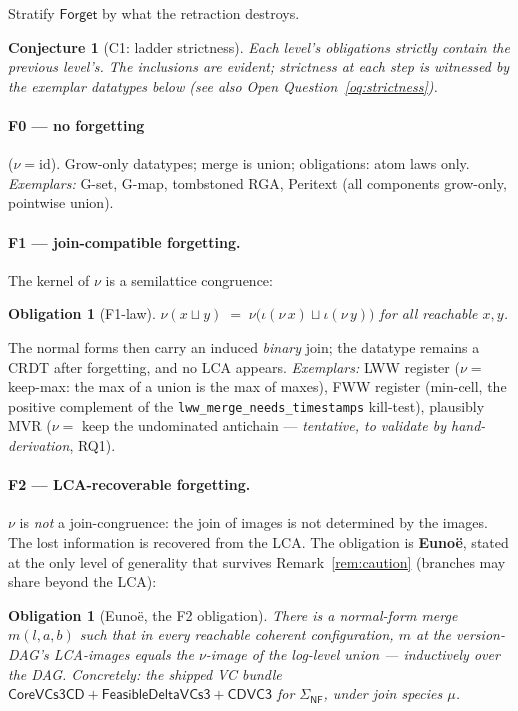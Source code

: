 \documentclass[11pt]{article}
\newtheorem{conjecture}[theorem]{Conjecture}
\newtheorem{obligation}[theorem]{Obligation}
\newcommand{\co}{\mathsf{CoreVCs3CD}}
\newcommand{\fd}{\mathsf{FeasibleDeltaVCs3}}
\newcommand{\cd}{\mathsf{CDVC3}}
\newcommand{\lean}[1]{\texttt{#1}}
\newcommand{\Forget}{\mathsf{Forget}}
\newcommand{\NF}{\mathsf{NF}}
\begin{document}
Stratify $\Forget$ by what the retraction destroys.

\begin{conjecture}[C1: ladder strictness]\label{conj:ladder}
Each level's obligations strictly contain the previous level's. The
inclusions are evident; strictness at each step is witnessed by the
exemplar datatypes below (see also Open
Question~\ref{oq:strictness}).
\end{conjecture}

\paragraph{F0 --- no forgetting} ($\nu = \mathrm{id}$). Grow-only
datatypes; merge is union; obligations: atom laws only.
\emph{Exemplars:} G-set, G-map, tombstoned RGA, Peritext (all components
grow-only, pointwise union).

\paragraph{F1 --- join-compatible forgetting.} The kernel of $\nu$ is a
semilattice congruence:
\begin{obligation}[F1-law]\label{obl:f1}
$\nu(x \sqcup y) \;=\; \nu\bigl(\iota(\nu\,x) \sqcup \iota(\nu\,y)\bigr)$
for all reachable $x, y$.
\end{obligation}
The normal forms then carry an induced \emph{binary} join; the datatype
remains a CRDT after forgetting, and no LCA appears. \emph{Exemplars:}
LWW register ($\nu =$ keep-max: the max of a union is the max of maxes),
FWW register (min-cell, the positive complement of the
\lean{lww\_merge\_needs\_timestamps} kill-test), plausibly MVR ($\nu =$
keep the undominated antichain --- \emph{tentative, to validate by
hand-derivation}, RQ1).

\paragraph{F2 --- LCA-recoverable forgetting.} $\nu$ is \emph{not} a
join-congruence: the join of images is not determined by the images. The
lost information is recovered from the LCA. The obligation is
\textbf{Euno\"e}, stated at the only level of generality that survives
Remark~\ref{rem:caution} (branches may share beyond the LCA):

\begin{obligation}[Euno\"e, the F2 obligation]\label{obl:eunoe}
There is a normal-form merge $m(l, a, b)$ such that in every reachable
coherent configuration, $m$ at the version-DAG's LCA-images equals the
$\nu$-image of the log-level union --- inductively over the DAG.
Concretely: the shipped VC bundle $\co + \fd + \cd$ for $\Sigma_\NF$,
under join species $\mu$.
\end{obligation}
\end{document}
